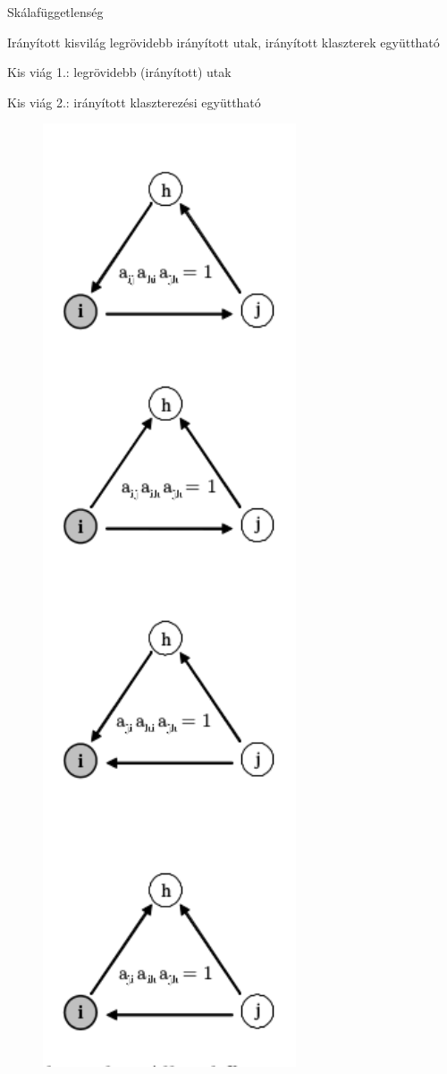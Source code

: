 \documentclass{beamer}
\newlength{\onecolwid}
\begin{document}
\begin{frame}[t]
\begin{columns}[t]
\begin{column}{\onecolwid}
      \begin{block}{Skálafüggetlenség}\end{block}
      \begin{alertblock}{Irányított kisvilág}  
        legrövidebb irányított utak, 
        irányított klaszterek együttható \citep{fagiolo2007clustering}
      \end{alertblock} %
        \begin{block}{Kis viág 1.: legrövidebb (irányított) utak} \end{block}
      \begin{block}{Kis viág 2.: irányított klaszterezési együttható}
        \begin{figure}
          \includegraphics[width=7.5cm]{triangle-directions}

\end{figure}
\end{block}
\end{column}
\end{columns}
\end{frame}
\end{document}
